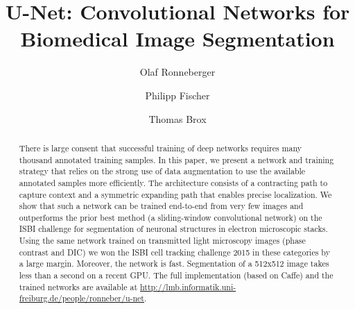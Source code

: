 \documentclass{llncs}
\begin{document}
%
\frontmatter          %
%
\pagestyle{headings}  %
%

\mainmatter              %
%
\title{U-Net: Convolutional Networks for Biomedical Image Segmentation}
%
%
\author{Olaf Ronneberger \and Philipp Fischer \and Thomas Brox}

%
%
%

\maketitle              %

\begin{abstract}
There is large consent that successful training of deep networks requires many thousand annotated training samples. In this paper, we present a network and training strategy that relies on the strong use of data augmentation to use the available annotated samples more efficiently. The architecture consists of a contracting path to capture context and a symmetric expanding path that enables precise localization. We show that such a network can be trained end-to-end from very few images and outperforms the prior best method (a sliding-window convolutional network) on the ISBI challenge for segmentation of neuronal structures in electron microscopic stacks. Using the same network trained on transmitted light microscopy images (phase contrast and DIC) we won the ISBI cell tracking challenge 2015 in these categories by a large margin. Moreover, the network is fast. Segmentation of a 512x512 image takes less than a second on a recent GPU. The full implementation (based on Caffe) and the trained networks are available at \href{http://lmb.informatik.uni-freiburg.de/people/ronneber/u-net}{http://lmb.informatik.uni-freiburg.de/people/ronneber/u-net}.
\end{abstract}
%
\end{document}
